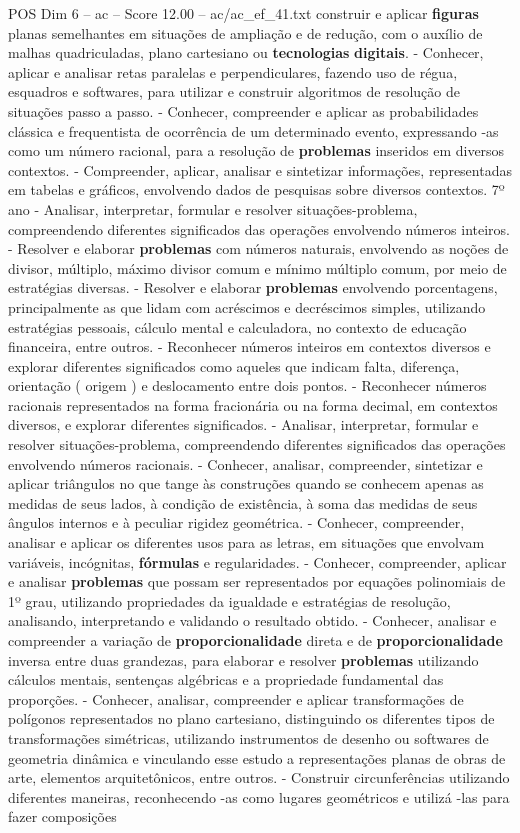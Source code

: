 \begin{textsample}{POS Dim 6 – ac – Score 12.00 – ac/ac\_ef\_41.txt}
construir e aplicar \textbf{figuras} planas semelhantes em situações de ampliação e de redução, com o auxílio de malhas quadriculadas, plano cartesiano ou \textbf{tecnologias} \textbf{digitais}. - Conhecer, aplicar e analisar retas paralelas e perpendiculares, fazendo uso de régua, esquadros e softwares, para utilizar e construir algoritmos de resolução de situações passo a passo. - Conhecer, compreender e aplicar as probabilidades clássica e frequentista de ocorrência de um determinado evento, expressando -as como um número racional, para a resolução de \textbf{problemas} inseridos em diversos contextos. - Compreender, aplicar, analisar e sintetizar informações, representadas em tabelas e gráficos, envolvendo dados de pesquisas sobre diversos contextos. 7º ano - Analisar, interpretar, formular e resolver situações-problema, compreendendo diferentes significados das operações envolvendo números inteiros. - Resolver e elaborar \textbf{problemas} com números naturais, envolvendo as noções de divisor, múltiplo, máximo divisor comum e mínimo múltiplo comum, por meio de estratégias diversas. - Resolver e elaborar \textbf{problemas} envolvendo porcentagens, principalmente as que lidam com acréscimos e decréscimos simples, utilizando estratégias pessoais, cálculo mental e calculadora, no contexto de educação financeira, entre outros. - Reconhecer números inteiros em contextos diversos e explorar diferentes significados como aqueles que indicam falta, diferença, orientação ( origem ) e deslocamento entre dois pontos. - Reconhecer números racionais representados na forma fracionária ou na forma decimal, em contextos diversos, e explorar diferentes significados. - Analisar, interpretar, formular e resolver situações-problema, compreendendo diferentes significados das operações envolvendo números racionais. - Conhecer, analisar, compreender, sintetizar e aplicar triângulos no que tange às construções quando se conhecem apenas as medidas de seus lados, à condição de existência, à soma das medidas de seus ângulos internos e à peculiar rigidez geométrica. - Conhecer, compreender, analisar e aplicar os diferentes usos para as letras, em situações que envolvam variáveis, incógnitas, \textbf{fórmulas} e regularidades. - Conhecer, compreender, aplicar e analisar \textbf{problemas} que possam ser representados por equações polinomiais de 1º grau, utilizando propriedades da igualdade e estratégias de resolução, analisando, interpretando e validando o resultado obtido. - Conhecer, analisar e compreender a variação de \textbf{proporcionalidade} direta e de \textbf{proporcionalidade} inversa entre duas grandezas, para elaborar e resolver \textbf{problemas} utilizando cálculos mentais, sentenças algébricas e a propriedade fundamental das proporções. - Conhecer, analisar, compreender e aplicar transformações de polígonos representados no plano cartesiano, distinguindo os diferentes tipos de transformações simétricas, utilizando instrumentos de desenho ou softwares de geometria dinâmica e vinculando esse estudo a representações planas de obras de arte, elementos arquitetônicos, entre outros. - Construir circunferências utilizando diferentes maneiras, reconhecendo -as como lugares geométricos e utilizá -las para fazer composições 
\end{textsample}
